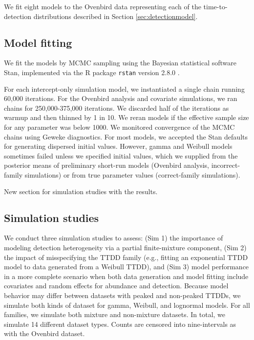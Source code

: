 \documentclass[useAMS,usenatbib,referee,12pt]{article}
\newcommand{\jarad}[1]{{\color{red} #1}}
\begin{document}
We fit eight models to the Ovenbird data representing each of the time-to-detection distributions described in Section \ref{sec:detectionmodel}.

\subsection{Model fitting}

We fit the models by MCMC sampling using the Bayesian statistical software Stan, implemented via the R package \texttt{rstan} version 2.8.0 \citep{Rstan2015}.  

For each intercept-only simulation model, we instantiated a single chain running 60,000 iterations.  For the Ovenbird analysis and covariate simulations, we ran chains for 250,000-375,000 iterations.  We discarded half of the iterations as warmup and then thinned by 1 in 10.  We reran models if the effective sample size for any parameter was below 1000.  We monitored convergence of the MCMC chains using Geweke diagnostics.  For most models, we accepted the Stan defaults for generating dispersed initial values.  However, gamma and Weibull models sometimes failed unless we specified initial values, which we supplied from the posterior means of preliminary short-run models (Ovenbird analysis, incorrect-family simulations) or from true parameter values (correct-family simulations).

\jarad{New section for simulation studies with the results.}

\subsection{Simulation studies}

We conduct three simulation studies to assess: (Sim 1) the importance of modeling detection heterogeneity via a partial finite-mixture component, (Sim 2) the impact of misspecifying the TTDD family (e.g., fitting an exponential TTDD model to data generated from a Weibull TTDD), and (Sim 3) model performance in a more complete scenario when both data generation and model fitting include covariates and random effects for abundance and detection.  Because model behavior may differ between datasets with peaked and non-peaked TTDDs, we simulate both kinds of dataset for gamma, Weibull, and lognormal models.  For all families, we simulate both mixture and non-mixture datasets.  In total, we simulate 14 different dataset types.  Counts are censored into nine-intervals as with the Ovenbird dataset.
\end{document}
